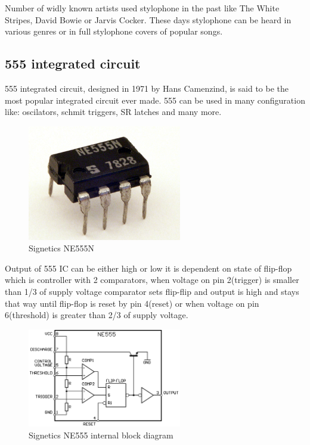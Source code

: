 \documentclass[english,10pt,a4paper]{article}
\begin{document}
	Number of widly known artists used stylophone in the past like The White Stripes, David Bowie or Jarvis Cocker. These days stylophone can be heard in various genres or in full stylophone covers of popular songs.
	
	\subsection{555 integrated circuit}
	555 integrated circuit, designed in 1971 by Hans Camenzind, is said to be the most popular integrated circuit ever made. 555 can be used in many configuration like: oscilators, schmit triggers, SR latches and many more.
	
	\begin{figure}[H]
		\centering
		\includegraphics[width=0.6\textwidth]{img/Signetics_NE555N.JPG}
		\caption{Signetics NE555N}
	\end{figure}
		
	Output of 555 IC can be either high or low it is dependent on state of flip-flop which is controller with 2 comparators, when voltage on pin 2(trigger) is smaller than 1/3 of supply voltage comparator sets flip-flip and output is high and stays that way until flip-flop is reset by pin 4(reset) or when voltage on pin 6(threshold) is greater than 2/3 of supply voltage.
		
	\begin{figure}[H]
		\centering
		\includegraphics[width=0.6\textwidth]{img/555_esquema.png}
		\caption{Signetics NE555 internal block diagram}
	\end{figure}
		

	
	
	
\end{document}
